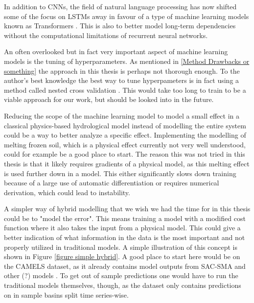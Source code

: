 In addition to CNNs, the field of natural language processing has now shifted some 
of the focus on LSTMs away in favour of a type of machine learning models known 
as Transformers \citep{transformers}. This is also to better model long-term 
dependencies without the computational limitations of recurrent neural networks.

An often overlooked but in fact very important aspect of machine learning models 
is the tuning of hyperparameters. As mentioned in \ref{Method Drawbacks or something} 
the approach in this thesis is perhaps not thorough enough. To the author's best 
knowledge the best way to tune hyperpameters is in fact using a method called nested 
cross validation \citationneeded. This would take too long to train to be a viable 
approach for our work, but should be looked into in the future.

Reducing the scope of the machine learning model to model a small effect in a 
classical physics-based hydrological model instead of modelling the entire system 
could be a way to better analyze a specific effect. Implementing the modelling of 
melting frozen soil, which is a physical effect currently not very well understood, 
could for example be a good place to start. The reason this was not tried in this 
thesis is that it likely requires gradients of a physical model, as this melting 
effect is used further down in a model. This either significantly slows down training 
because of a large use of automatic differentiation or requires numerical derivation, 
which could lead to instability.

A simpler way of hybrid modelling that we wish we had the time for in this thesis 
could be to "model the error". This means training a model with a modified cost 
function where it also takes the input from a physical model. This could give a 
better indication of what information in the data is the most important and not 
properly utilized in traditional models. A simple illustration of this concept 
is shown in Figure \ref{figure simple hybrid}. A good place to start here would 
be on the CAMELS dataset, as it already contains model outputs from SAC-SMA and 
other (?) models \citep{CAMELS_US}. To get out of sample predictions one would have 
to run the traditional models themselves, though, as the dataset only contains 
predictions on in sample basins split time series-wise.
